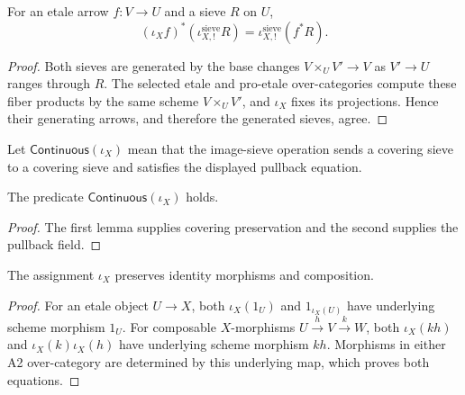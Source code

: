 \begin{lemma}
\label{lemma:weil-efi-site-covering-sieve-pullback}
For an etale arrow $f:V\to U$ and a sieve $R$ on $U$,
\[
 (\iota_Xf)^*(\iota_{X,!}^{\mathrm{sieve}}R)
 =\iota_{X,!}^{\mathrm{sieve}}(f^*R).
\]
\end{lemma}
\begin{proof}
Both sieves are generated by the base changes
$V\times_UV'\to V$ as $V'\to U$ ranges through $R$.  The selected etale and
pro-etale over-categories compute these fiber products by the same scheme
$V\times_UV'$, and $\iota_X$ fixes its projections.  Hence their generating
arrows, and therefore the generated sieves, agree.
\end{proof}

\begin{definition}
\label{def:weil-efi-site-continuity-certificate}
Let $\mathsf{Continuous}(\iota_X)$ mean that the image-sieve operation sends a
covering sieve to a covering sieve and satisfies the displayed pullback
equation.
\end{definition}

\begin{proposition}
\label{prop:weil-efi-site-continuity-certificate}
The predicate $\mathsf{Continuous}(\iota_X)$ holds.
\end{proposition}
\begin{proof}
The first lemma supplies covering preservation and the second supplies the
pullback field.
\end{proof}

\begin{lemma}
\label{lemma:weil-pbc-etale-proetale-functor}
The assignment $\iota_X$ preserves identity morphisms and composition.
\end{lemma}
\begin{proof}
For an etale object $U\to X$, both $\iota_X(1_U)$ and
$1_{\iota_X(U)}$ have underlying scheme morphism $1_U$.  For composable
$X$-morphisms $U\xrightarrow{h}V\xrightarrow{k}W$, both
$\iota_X(kh)$ and $\iota_X(k)\iota_X(h)$ have underlying scheme morphism
$kh$.  Morphisms in either A2 over-category are determined by this underlying
map, which proves both equations.
\end{proof}

